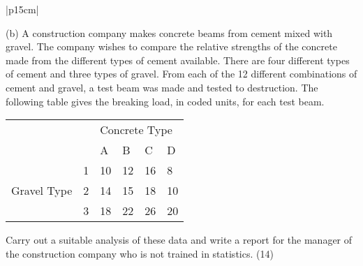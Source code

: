 \documentclass[a4paper,12pt]{article}
\begin{document}
\begin{table}[ht!]
 
\centering
 
\begin{tabular}{|p{15cm}|}
 
\hline  
  
(b) A construction company makes concrete beams from cement mixed with gravel.  
The company wishes to compare the relative strengths of the concrete made from the different types of cement available.  There are four different types of cement and three types of gravel.  From each of the 12 different combinations of cement and gravel, a test beam was made and tested to destruction.  The following table gives the breaking load, in coded units, for each test beam. 
 
\begin{center}
\begin{tabular}{llllll}
\cline{3-6}
                                                   & \multicolumn{1}{l|}{}  & \multicolumn{4}{l|}{Concrete Type}                                                                    \\ \cline{3-6} 
                                                   & \multicolumn{1}{l|}{}  & \multicolumn{1}{l|}{A}  & \multicolumn{1}{l|}{B}  & \multicolumn{1}{l|}{C}  & \multicolumn{1}{l|}{D}  \\ \hline
\multicolumn{1}{|l|}{\multirow{3}{*}{Gravel Type}} & \multicolumn{1}{l|}{1} & \multicolumn{1}{l|}{10} & \multicolumn{1}{l|}{12} & \multicolumn{1}{l|}{16} & \multicolumn{1}{l|}{8}  \\ \cline{2-6} 
\multicolumn{1}{|l|}{}                             & \multicolumn{1}{l|}{2} & \multicolumn{1}{l|}{14} & \multicolumn{1}{l|}{15} & \multicolumn{1}{l|}{18} & \multicolumn{1}{l|}{10} \\ \cline{2-6} 
\multicolumn{1}{|l|}{}                             & \multicolumn{1}{l|}{3} & \multicolumn{1}{l|}{18} & \multicolumn{1}{l|}{22} & \multicolumn{1}{l|}{26} & \multicolumn{1}{l|}{20} \\ \hline
         
\end{tabular}
\end{center}
 
 
Carry out a suitable analysis of these data and write a report for the manager of the construction company who is not trained in statistics. (14) 
 
\\ \hline
  
\end{tabular}

\end{table} 
\end{document}
